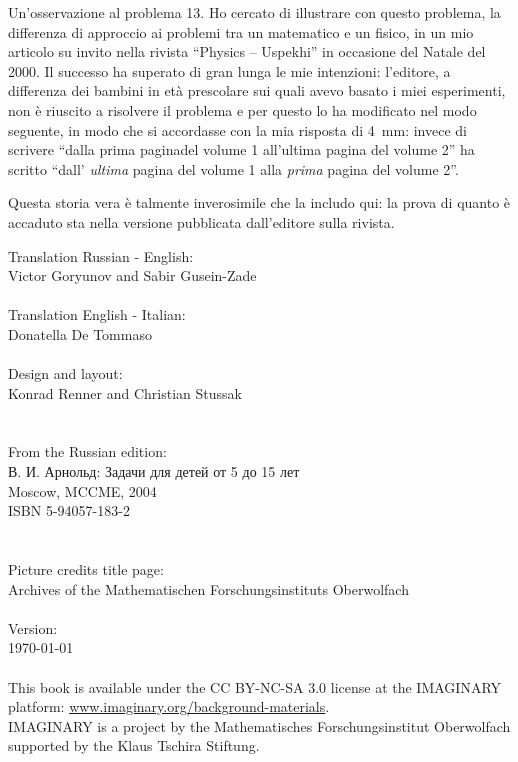 \null\vfill
\begin{note}{Un'osservazione al problema 13.}
	Ho cercato di illustrare con questo problema, la differenza di approccio ai problemi tra un matematico e un fisico, in un mio articolo su invito nella rivista \enquote{Physics -- Uspekhi} in occasione del Natale del 2000. Il successo ha superato di gran lunga le mie intenzioni: l’editore, a differenza dei bambini in età prescolare sui quali avevo basato i miei esperimenti,
non è riuscito a risolvere il problema e per questo lo ha modificato nel modo seguente, in modo che si accordasse con la mia risposta di \SI{4}{\mm}: invece di scrivere \enquote{dalla prima paginadel volume 1 all'ultima pagina del volume 2} ha scritto \enquote{dall' \emph{ultima} pagina del volume 1 alla \emph{prima} pagina del volume 2}.

	Questa storia vera è talmente inverosimile che la includo qui: la prova di quanto è accaduto sta nella versione pubblicata dall’editore sulla rivista.
\end{note}
\clearpage
\null\vfill
\noindent
Translation Russian - English:\\
\null\quad Victor Goryunov and Sabir Gusein-Zade\\
\\
\noindent
Translation English - Italian:\\
\null\quad Donatella De Tommaso\\
\\
Design and layout:\\
\null\quad Konrad Renner and Christian Stussak\\
\\
\\
From the Russian edition:\\
\null\quad \textrussian{В. И. Арнольд: Задачи для детей от 5 до 15 лет}\\
\null\quad Moscow, MCCME, 2004\\
\null\quad ISBN 5-94057-183-2\\
\\
\\
Picture credits title page:\\ 
\null\quad Archives of the Mathematischen Forschungsinstituts Oberwolfach\\
\\
Version:\\
\null\quad \today\\
\\
This book is available under the CC BY-NC-SA 3.0 license at the IMAG\-I\-NARY platform: \href{http://www.imaginary.org/background-materials}{www.imaginary.org/background-materials}.\\
IMAGINARY is a project by the Mathematisches Forschungsinstitut Oberwolfach supported by the Klaus Tschira Stiftung.

